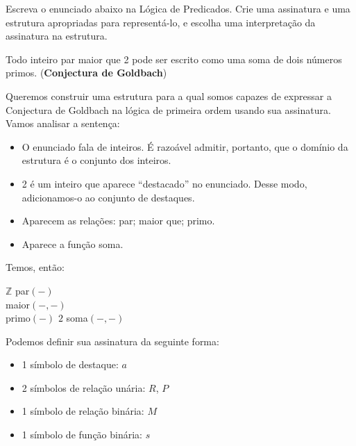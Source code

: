 \begin{rexercises}
    \begin{question}
        Escreva o enunciado abaixo na Lógica de Predicados. Crie uma assinatura e uma estrutura apropriadas para representá-lo, e escolha uma interpretação da assinatura na estrutura.
        \begin{center}
            Todo inteiro par maior que 2 pode ser escrito como uma soma de dois números primos. (\textbf{Conjectura de Goldbach})
        \end{center}
        \begin{resolution}
            Queremos construir uma estrutura para a qual somos capazes de expressar a Conjectura de Goldbach na lógica de primeira ordem usando sua assinatura. Vamos analisar a sentença:
            \begin{itemize}
                \item O enunciado fala de inteiros. É razoável admitir, portanto, que o domínio da estrutura é o conjunto dos inteiros.
                \item 2 é um inteiro que aparece ``destacado'' no enunciado. Desse modo, adicionamos-o ao conjunto de destaques.
                \item Aparecem as relações: par; maior que; primo.
                \item Aparece a função soma.
            \end{itemize}
            Temos, então:
            \begin{center}
                \begin{structure}
                    {$\mathbb{Z}$}
                    {}
                    {par$(-)$\\maior$(-,-)$\\primo$(-)$}
                    {$2$}
                    {soma$(-,-)$}
                \end{structure}
            \end{center}
            Podemos definir sua assinatura da seguinte forma:
            \begin{itemize}
                \item 1 símbolo de destaque: $a$
                \item 2 símbolos de relação unária: $R$, $P$
                \item 1 símbolo de relação binária: $M$
                \item 1 símbolo de função binária: $s$
            \end{itemize}

\end{resolution}
\end{question}
\end{rexercises}
